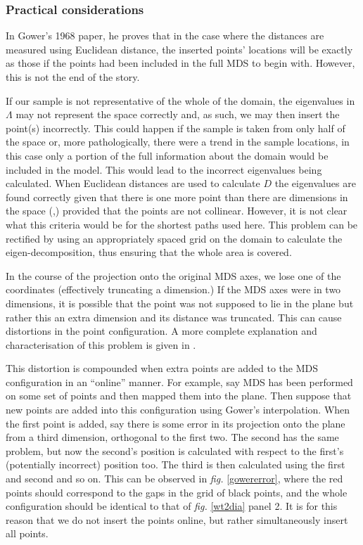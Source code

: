 \documentclass[a4paper,10pt]{article}
\newcommand{\fig}[1]{\emph{fig.} \ref{#1}}
\begin{document}
\subsubsection{Practical considerations}

In Gower's 1968 paper, he proves that in the case where the distances are measured using Euclidean distance, the inserted points' locations will be exactly as those if the points had been included in the full MDS to begin with. However, this is not the end of the story.

If our sample is not representative of the whole of the domain, the eigenvalues in $\Lambda$ may not represent the space correctly and, as such, we may then insert the point(s) incorrectly. This could happen if the sample is taken from only half of the space or, more pathologically, there were a trend in the sample locations, in this case only a portion of the full information about the domain would be included in the model. This would lead to the incorrect eigenvalues being calculated. When Euclidean distances are used to calculate $D$ the eigenvalues are found correctly given that there is one more point than there are dimensions in the space (\cite{landmark},) provided that the points are not collinear. However, it is not clear what this criteria would be for the shortest paths used here. This problem can be rectified by using an appropriately spaced grid on the domain to calculate the eigen-decomposition, thus ensuring that the whole area is covered.

In the course of the projection onto the original MDS axes, we lose one of the coordinates (effectively truncating a dimension.) If the MDS axes were in two dimensions, it is possible that the point was not supposed to lie in the plane but rather this an extra dimension and its distance was truncated. This can cause distortions in the point configuration. A more complete explanation and characterisation of this problem is given in \cite{Boj2009}. 

This distortion is compounded when extra points are added to the MDS configuration in an ``online'' manner. For example, say MDS has been performed on some set of points and then mapped them into the plane. Then suppose that new points are added into this configuration using Gower's interpolation. When the first point is added, say there is some error in its projection onto the plane from a third dimension, orthogonal to the first two. The second has the same problem, but now the second's position is calculated with respect to the first's (potentially incorrect) position too. The third is then calculated using the first and second and so on. This can be observed in \fig{gowererror}, where the red points should correspond to the gaps in the grid of black points, and the whole configuration should be identical to that of \fig{wt2dia} panel 2. It is for this reason that we do not insert the points online, but rather simultaneously insert all points.
\end{document}
